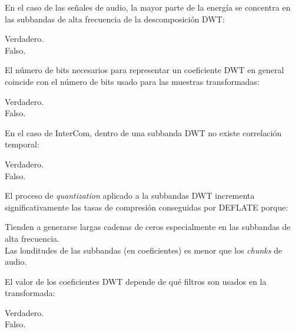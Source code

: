 \documentclass[legalpaper, 12pt, addpoints]{exam}
\begin{document}
\begin{questions}
\vspace{0.10in}

\question En el caso de las señales de audio, la mayor parte de la
energía se concentra en las subbandas de alta frecuencia de la
descomposición DWT:

\begin{oneparchoices}
  \choice Verdadero.\\
  \choice Falso.
\end{oneparchoices}
  
\vspace{0.10in}

\question El número de bits necesarios para representar un coeficiente
DWT en general coincide con el número de bits usado para las muestras
transformadas:

\begin{oneparchoices}
  \choice Verdadero.\\
  \choice Falso.
\end{oneparchoices}
  
\vspace{0.10in}

\question En el caso de InterCom, dentro de una subbanda DWT no existe
correlación temporal:

\begin{oneparchoices}
  \choice Verdadero.\\
  \choice Falso.
\end{oneparchoices}
  
\vspace{0.10in}

\question El proceso de \emph{quantization} aplicado a la subbandas DWT
incrementa significativamente las tasas de compresión conseguidas por
DEFLATE porque:

\begin{oneparchoices}
  \choice Tienden a generarse largas cadenas de ceros especialmente en las subbandas de alta frecuencia.\\
  \choice Las londitudes de las subbandas (en coeficientes) es menor que los \emph{chunks} de audio.
\end{oneparchoices}
  
\vspace{0.10in}

\question El valor de los coeficientes DWT depende de qué filtros son usados en la transformada:

\begin{oneparchoices}
  \choice Verdadero.\\
  \choice Falso.
\end{oneparchoices}
  

\end{questions}
\end{document}
